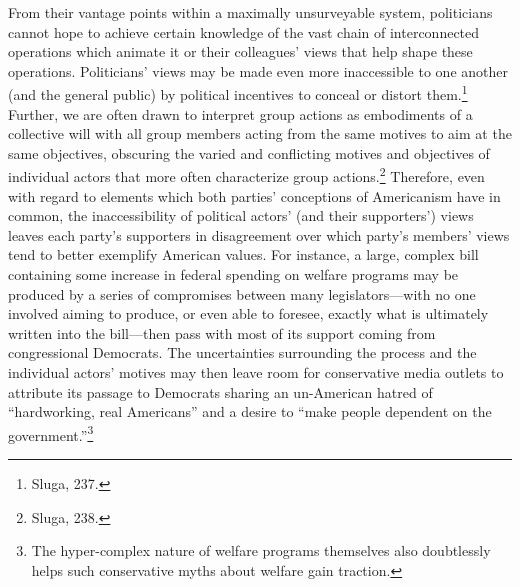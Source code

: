 From their vantage points within a maximally unsurveyable system,
politicians cannot hope to achieve certain knowledge of the vast chain
of interconnected operations which animate it or their colleagues' views
that help shape these operations. Politicians' views may be made even
more inaccessible to one another (and the general public) by political
incentives to conceal or distort them.\footnote{Sluga, 237.} Further, we
are often drawn to interpret group actions as embodiments of a
collective will with all group members acting from the same motives to
aim at the same objectives, obscuring the varied and conflicting motives
and objectives of individual actors that more often characterize group
actions.\footnote{Sluga, 238.} Therefore, even with regard to elements
which both parties' conceptions of Americanism have in common, the
inaccessibility of political actors' (and their supporters') views
leaves each party's supporters in disagreement over which party's
members' views tend to better exemplify American values. For instance, a
large, complex bill containing some increase in federal spending on
welfare programs may be produced by a series of compromises between many
legislators---with no one involved aiming to produce, or even able to
foresee, exactly what is ultimately written into the bill---then pass
with most of its support coming from congressional Democrats. The
uncertainties surrounding the process and the individual actors' motives
may then leave room for conservative media outlets to attribute its
passage to Democrats sharing an un-American hatred of ``hardworking,
real Americans'' and a desire to ``make people dependent on the
government.''\footnote{The hyper-complex nature of welfare programs
  themselves also doubtlessly helps such conservative myths about
  welfare gain traction.}

